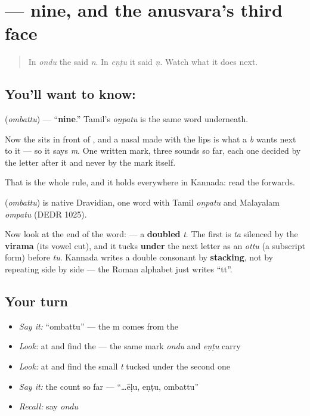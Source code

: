 \section[\texorpdfstring{\kn{ಒಂಬತ್ತು} (ombattu)}{ಒಂಬತ್ತು (ombattu)}]{ — nine, and the anusvara's third face}

\label{lesson:KA-C07-ombattu}



\begin{quote}
In \emph{ondu} the  said \emph{n}. In \emph{eṇṭu} it said \emph{ṇ}. Watch what it does next.
\end{quote}

\subsection*{You'll want to know: }
\textbf{} (\emph{ombattu}) — \textquotedblleft{}\textbf{nine}.\textquotedblright{} Tamil's \emph{oṉpatu} is the same word underneath.

Now the  sits in front of \textbf{}, and a nasal made with the lips is what a \emph{b} wants next to it — so it says \emph{m}. One written mark, three sounds so far, each one decided by the letter after it and never by the mark itself.

That is the whole rule, and it holds everywhere in Kannada: read the  forwards.

\begin{cousinweb}
\textbf{} (\emph{ombattu}) is native Dravidian, one word with Tamil \emph{oṉpatu} and Malayalam \emph{ompatu} (DEDR 1025).
\end{cousinweb}

\begin{sounds}
Now look at the end of the word: \textbf{} — a \textbf{doubled} \emph{t}. The first \textbf{} is \emph{ta} silenced by the \textbf{virama} (its vowel cut), and it tucks \textbf{under} the next letter as an \emph{ottu} (a subscript form) before \textbf{} \emph{tu}. Kannada writes a double consonant by \textbf{stacking}, not by repeating side by side — the Roman alphabet just writes \textquotedblleft{}tt\textquotedblright{}.
\end{sounds}

\subsection*{Your turn}
\begin{itemize}
\raggedright
  \item \emph{Say it:} \textquotedblleft{}ombattu\textquotedblright{} — the m comes from the 
  \item \emph{Look:} at  and find the  — the same mark \emph{ondu} and \emph{eṇṭu} carry
  \item \emph{Look:} at  and find the small \emph{t} tucked under the second one
  \item \emph{Say it:} the count so far — \textquotedblleft{}…ēḷu, eṇṭu, ombattu\textquotedblright{}
  \item \emph{Recall:} say \emph{ondu}
\end{itemize}

